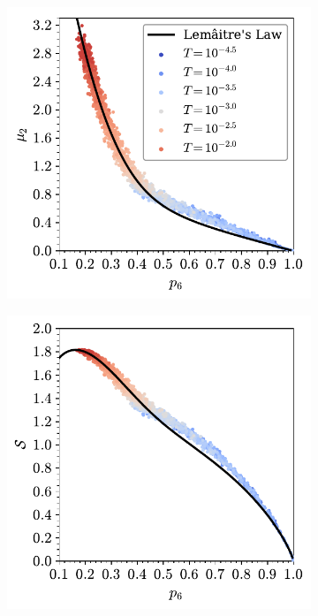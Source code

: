 \begin{figure}[bt]
     \centering
     
     \begin{subfigure}[b]{0.45\textwidth}
         \centering
         \includegraphics[width=\textwidth]{./figures/bilayers/tri_raft_lm_1.pdf}
         \caption{}
         \label{fig:trlm1}
     \end{subfigure}
     \hfill
     \begin{subfigure}[b]{0.45\textwidth}
         \centering
         \includegraphics[width=\textwidth]{./figures/bilayers/tri_raft_lm_3.pdf}

\end{subfigure}
\end{figure}
